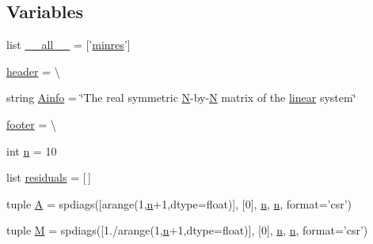 \subsection*{Variables}
\begin{DoxyCompactItemize}
\item 
list \hyperlink{namespacescipy_1_1sparse_1_1linalg_1_1isolve_1_1minres_af69ba64202cd3853471b8322cb81c46d}{\+\_\+\+\_\+all\+\_\+\+\_\+} = \mbox{[}'\hyperlink{namespacescipy_1_1sparse_1_1linalg_1_1isolve_1_1minres_adbbf23f2db0af0399bc0b2119eb2fb99}{minres}'\mbox{]}
\item 
\hyperlink{namespacescipy_1_1sparse_1_1linalg_1_1isolve_1_1minres_a5fea6cbb55847984143033a57a91fe66}{header} = \textbackslash{}
\item 
string \hyperlink{namespacescipy_1_1sparse_1_1linalg_1_1isolve_1_1minres_a97c1dfd1e2c89a855d5de8e990d01b61}{Ainfo} = \char`\"{}The real symmetric \hyperlink{polmisc_8c_a0240ac851181b84ac374872dc5434ee4}{N}-\/by-\/\hyperlink{polmisc_8c_a0240ac851181b84ac374872dc5434ee4}{N} matrix of the \hyperlink{interpolate_8h_a556796c3dce5ad921ab3e083f1ca81fa}{linear} system\char`\"{}
\item 
\hyperlink{namespacescipy_1_1sparse_1_1linalg_1_1isolve_1_1minres_adfb72a82f5286d99287fe32c27793650}{footer} = \textbackslash{}
\item 
int \hyperlink{namespacescipy_1_1sparse_1_1linalg_1_1isolve_1_1minres_a08c21ee0b8f5d10e974baddb4a661372}{n} = 10
\item 
list \hyperlink{namespacescipy_1_1sparse_1_1linalg_1_1isolve_1_1minres_a5e0a04e672c307fa37d3a41e42076439}{residuals} = \mbox{[}$\,$\mbox{]}
\item 
tuple \hyperlink{namespacescipy_1_1sparse_1_1linalg_1_1isolve_1_1minres_a14232e29588a20e81e969b2ef0b3494d}{A} = spdiags(\mbox{[}arange(1,\hyperlink{namespacescipy_1_1sparse_1_1linalg_1_1isolve_1_1minres_a08c21ee0b8f5d10e974baddb4a661372}{n}+1,dtype=float)\mbox{]}, \mbox{[}0\mbox{]}, \hyperlink{namespacescipy_1_1sparse_1_1linalg_1_1isolve_1_1minres_a08c21ee0b8f5d10e974baddb4a661372}{n}, \hyperlink{namespacescipy_1_1sparse_1_1linalg_1_1isolve_1_1minres_a08c21ee0b8f5d10e974baddb4a661372}{n}, format='csr')
\item 
tuple \hyperlink{namespacescipy_1_1sparse_1_1linalg_1_1isolve_1_1minres_acb6d2090dfcf8d017ae929466ef3ce8b}{M} = spdiags(\mbox{[}1./arange(1,\hyperlink{namespacescipy_1_1sparse_1_1linalg_1_1isolve_1_1minres_a08c21ee0b8f5d10e974baddb4a661372}{n}+1,dtype=float)\mbox{]}, \mbox{[}0\mbox{]}, \hyperlink{namespacescipy_1_1sparse_1_1linalg_1_1isolve_1_1minres_a08c21ee0b8f5d10e974baddb4a661372}{n}, \hyperlink{namespacescipy_1_1sparse_1_1linalg_1_1isolve_1_1minres_a08c21ee0b8f5d10e974baddb4a661372}{n}, format='csr')

\end{DoxyCompactItemize}
